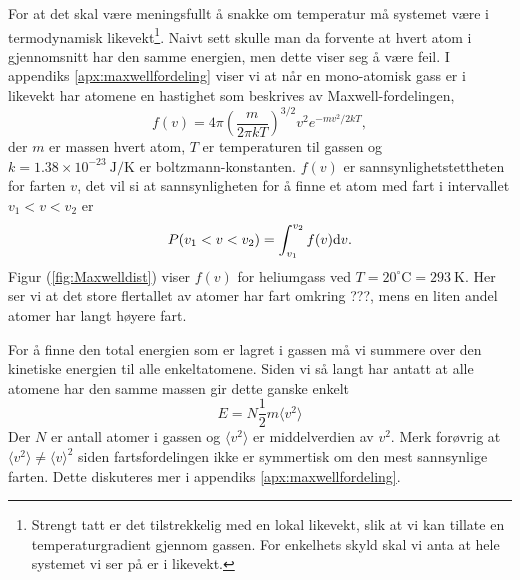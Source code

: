 For at det skal være meningsfullt å snakke om temperatur må systemet være i termodynamisk likevekt\footnote{Strengt tatt er det tilstrekkelig med en lokal likevekt, slik at vi kan tillate en temperaturgradient gjennom gassen. For enkelhets skyld skal vi anta at hele systemet vi ser på er i likevekt.}. Naivt sett skulle man da forvente at hvert atom i gjennomsnitt har den samme energien, men dette viser seg å være feil. I appendiks \ref{apx:maxwellfordeling} viser vi at når en mono-atomisk gass er i likevekt har atomene en hastighet som beskrives av Maxwell-fordelingen,
\begin{equation}
\label{eq:kinetiskgassteori:fv}	
	f(v) = 4\pi\left( \frac{m}{2\pi kT} \right)^{3/2} v^2e^{-mv^2/2kT},
\end{equation}
der $m$ er massen hvert atom, $T$ er temperaturen til gassen og $k = 1.38\times10^{-23}~\mathrm{J/K}$ er boltzmann-konstanten. $f(v)$ er sannsynlighetstettheten for farten $v$, det vil si at sannsynligheten for å finne et atom med fart i intervallet $v_1<v<v_2$ er
\begin{displaymath}
	P(v_1 < v < v_2) = \int_{v_1}^{v_2} f(v) \text{d} v.
\end{displaymath}
Figur (\ref{fig:Maxwelldist}) viser $f(v)$ for heliumgass ved $T=20^\circ\mathrm{C} = 293~\mathrm{K}$. Her ser vi at det store flertallet av atomer har fart omkring ???, mens en liten andel atomer har langt høyere fart. 

For å finne den total energien som er lagret i gassen må vi summere over den kinetiske energien til alle enkeltatomene. Siden vi så langt har antatt at alle atomene har den samme massen gir dette ganske enkelt
\begin{displaymath}
	E = N\frac{1}{2}m\langle v^2 \rangle
\end{displaymath}
Der $N$ er antall atomer i gassen og $\langle v^2 \rangle$ er middelverdien av $v^2$. Merk forøvrig at $\langle v^2 \rangle \neq \langle v \rangle^2$ siden fartsfordelingen ikke er symmertisk om den mest sannsynlige farten. Dette diskuteres mer i appendiks \ref{apx:maxwellfordeling}.


